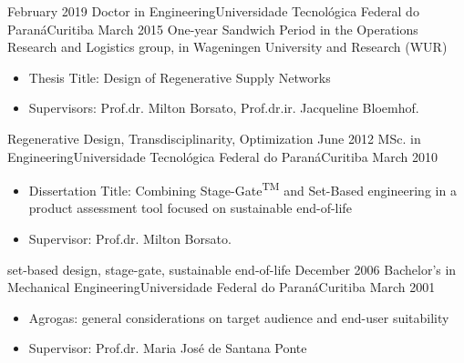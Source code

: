 %
%
%


\begin{experiences}
\consultantexperience
    {February 2019}   {Doctor in Engineering}{Universidade Tecnológica Federal do Paraná}{Curitiba}
    {March 2015} {One-year Sandwich Period in the Operations Research and Logistics group, in Wageningen University and Research (WUR)}{}
                    {
                      \begin{itemize}
                        \item Thesis Title: Design of Regenerative Supply Networks      \item Supervisors: Prof.dr. Milton Borsato, Prof.dr.ir. Jacqueline Bloemhof.        
                      \end{itemize}
                   } {Regenerative Design, Transdisciplinarity, Optimization}
\emptySeparator   
\acaexperience
    {June 2012}   {MSc. in Engineering}{Universidade Tecnológica Federal do Paraná}{Curitiba}
    {March 2010} {
                    \begin{itemize}
                        \item Dissertation Title: Combining Stage-Gate\textsuperscript{TM} and Set-Based engineering in a product assessment tool focused on sustainable end-of-life
                        \item Supervisor: Prof.dr. Milton Borsato.        
                   \end{itemize}
                      }{set-based design, stage-gate, sustainable end-of-life}  
\emptySeparator   
\experience
    {December 2006}   {Bachelor's in Mechanical Engineering}{Universidade Federal do Paraná}{Curitiba}
    {March 2001} {\begin{itemize}
        \item Agrogas: general considerations on target audience and end-user suitability 
        \item Supervisor: Prof.dr. Maria José de Santana Ponte
    \end{itemize}
                      
                   }
\end{experiences}

